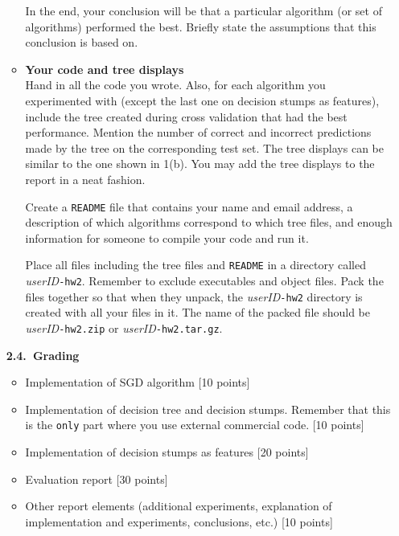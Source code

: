 \begin{enumerate}
\begin{itemize}
  In the end, your conclusion will be that a particular algorithm (or
  set of algorithms) performed the best.  Briefly state the
  assumptions that this conclusion is based on.

 \item {\bf Your code and tree displays} \\
  Hand in all the code you wrote. Also, for each algorithm you
  experimented with (except the last one on decision stumps as features), include the tree created
  during cross validation that had the best performance. Mention the number of correct and incorrect
  predictions made by the tree on the corresponding test set. The tree displays
  can be similar to the one shown in 1(b). 
You may add the tree displays to the report in a neat fashion.

Create a {\tt README} file that
  contains your name and email address, a description of which algorithms
  correspond to which tree files, and enough information for someone to compile
  your code and run it.

  Place all files including the tree files and {\tt README} in a
  directory called {\em userID}{\tt -hw2}.  Remember to exclude
  executables and object files.  Pack the files together so that when
  they unpack, the {\em userID}{\tt -hw2} directory is created with
  all your files in it.  The name of the packed file should be {\em
    userID}{\tt -hw2.zip} or {\em userID}{\tt -hw2.tar.gz}.
\end{itemize}


\textbf{2.4.~Grading}
\begin{itemize}
\item Implementation of  SGD algorithm [10 points]
\item Implementation of decision tree and decision stumps. Remember that this is the
\texttt{only} part where you use external commercial code. [10 points]
\item Implementation of decision stumps as features [20 points]
\item Evaluation report [30 points]
\item Other report elements (additional experiments, explanation of
  implementation and experiments, conclusions, etc.) [10 points]
\end{itemize}

\end{enumerate}



